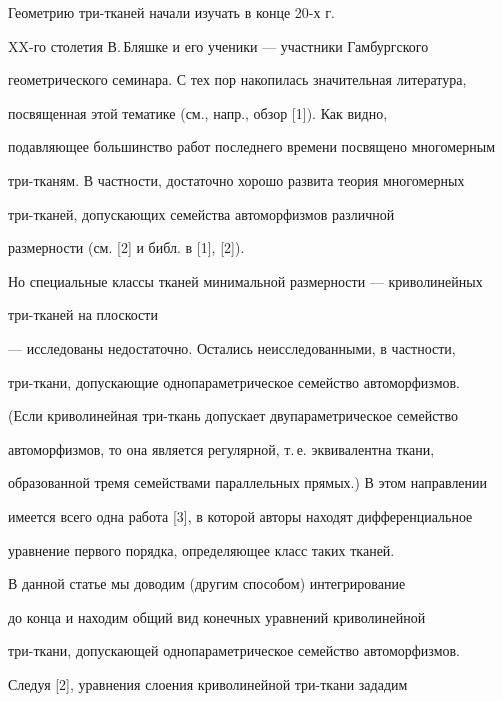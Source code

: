  


 


 


Геометрию три-тканей начали изучать в конце 20-х г. 


XX-го столетия В.\,Бляшке и его ученики --- участники Гамбургского 


геометрического семинара. С тех пор накопилась значительная литература, 


посвященная этой тематике (см., напр., обзор [1]). Как видно, 


подавляющее большинство работ последнего времени посвящено многомерным 


три-тканям. В частности, достаточно хорошо развита теория многомерных 


три-тканей, допускающих семейства автоморфизмов различной 


размерности (см. [2] и библ. в [1], [2]). 


Но специальные классы тканей минимальной размерности --- криволинейных 


три-тканей на плоскости 


--- исследованы недостаточно. Остались неисследованными, в частности, 


три-ткани, допускающие однопараметрическое семейство автоморфизмов. 


(Если криволинейная три-ткань допускает двупараметрическое семейство 


автоморфизмов, то она является регулярной, т.\,е. эквивалентна ткани, 


образованной тремя семействами параллельных прямых.) В этом направлении 


имеется всего одна работа [3], в которой авторы находят дифференциальное 


уравнение первого порядка, определяющее класс таких тканей. 


 


В данной статье мы доводим (другим способом) интегрирование 


до конца и находим общий вид конечных уравнений криволинейной 


три-ткани, допускающей однопараметрическое семейство автоморфизмов. 


\medskip 


 


Следуя [2], уравнения слоения криволинейной три-ткани зададим 


